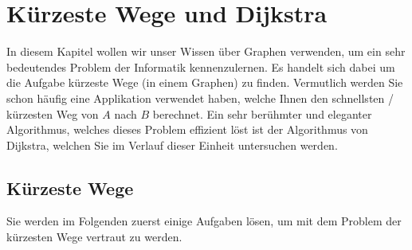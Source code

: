 \chapter{Kürzeste Wege und Dijkstra}\label{ch:Lektion2}
In diesem Kapitel wollen wir unser Wissen über Graphen verwenden, um ein sehr bedeutendes Problem der Informatik kennenzulernen. Es handelt sich dabei um die Aufgabe kürzeste Wege (in einem Graphen) zu finden. Vermutlich werden Sie schon häufig eine Applikation verwendet haben, welche Ihnen den schnellsten / kürzesten Weg von $A$ nach $B$ berechnet. Ein sehr berühmter und eleganter Algorithmus, welches dieses Problem effizient löst ist der Algorithmus von Dijkstra, welchen Sie im Verlauf dieser Einheit untersuchen werden.

\section{Kürzeste Wege}
Sie werden im Folgenden zuerst einige Aufgaben lösen, um mit dem Problem der kürzesten Wege vertraut zu werden.

